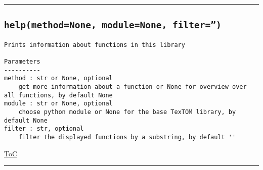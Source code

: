 \documentclass{article}
\begin{document}


\vspace{5mm}

\hrule

\subsection*{\texttt{help(method=None, module=None, filter='')}}

\begin{lstlisting}[language=docstring]
Prints information about functions in this library

Parameters
----------
method : str or None, optional
    get more information about a function or None for overview over all functions, by default None
module : str or None, optional
    choose python module or None for the base TexTOM library, by default None
filter : str, optional
    filter the displayed functions by a substring, by default ''
\end{lstlisting}

\begin{flushright}

\hyperref[toc]{ToC}

\end{flushright}



\vspace{5mm}

\hrule
\end{document}
